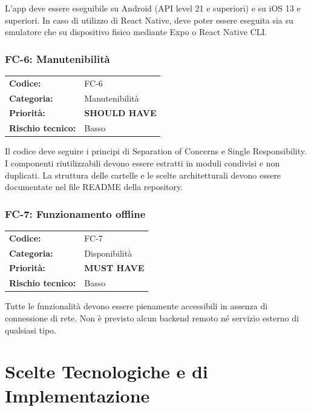 \documentclass[12pt, a4paper]{article}
\newcommand{\MUST}{\colorbox{musthave}{\small\textbf{MUST HAVE}}}
\newcommand{\SHOULD}{\colorbox{shouldhave}{\small\textbf{SHOULD HAVE}}}
\newcommand{\RISKL}{\colorbox{risklow}{\small Basso}}
\begin{document}
\medskip
\noindent
L'app deve essere eseguibile su Android (API level 21 e superiori) e su iOS 13 e
superiori. In caso di utilizzo di React Native, deve poter essere eseguita sia su
emulatore che su dispositivo fisico mediante Expo o React Native CLI.

\subsubsection{FC-6: Manutenibilità}

\begin{tabular}{@{}ll@{}}
  \toprule
  \textbf{Codice:}          & FC-6 \\
  \textbf{Categoria:}       & Manutenibilità \\
  \textbf{Priorità:}        & \SHOULD \\
  \textbf{Rischio tecnico:} & \RISKL \\
  \bottomrule
\end{tabular}

\medskip
\noindent
Il codice deve seguire i principi di Separation of Concerns e Single Responsibility.
I componenti riutilizzabili devono essere estratti in moduli condivisi e non duplicati.
La struttura delle cartelle e le scelte architetturali devono essere documentate nel file
README della repository.

\subsubsection{FC-7: Funzionamento offline}

\begin{tabular}{@{}ll@{}}
  \toprule
  \textbf{Codice:}          & FC-7 \\
  \textbf{Categoria:}       & Disponibilità \\
  \textbf{Priorità:}        & \MUST \\
  \textbf{Rischio tecnico:} & \RISKL \\
  \bottomrule
\end{tabular}

\medskip
\noindent
Tutte le funzionalità devono essere pienamente accessibili in assenza di connessione
di rete. Non è previsto alcun backend remoto né servizio esterno di qualsiasi tipo.

\section{Scelte Tecnologiche e di Implementazione}
\end{document}
